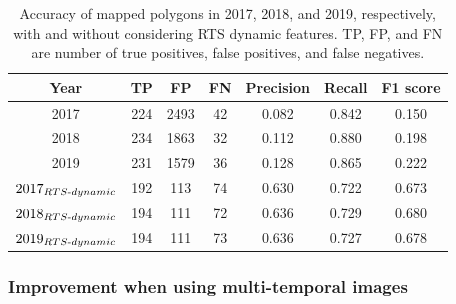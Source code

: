 \documentclass[authoryear,preprint,review,12pt]{elsarticle}
\begin{document}
\begin{table}[ht]
\footnotesize
  \centering
  \caption{Accuracy of mapped polygons in 2017, 2018, and 2019, respectively, with and without considering RTS dynamic features. TP, FP, and FN are number of true positives, false positives, and false negatives.}
    \begin{tabular}{c c c c c c c}
\toprule
    \textbf{Year} & \textbf{TP} & \textbf{FP} & \textbf{FN} & \textbf{Precision} & \textbf{Recall} & \textbf{F1 score} \\
\midrule
   2017 & 224   & 2493  & 42    & 0.082 & 0.842 & 0.150 \\
   2018 & 234   & 1863  & 32    & 0.112 & 0.880 & 0.198 \\
   2019 & 231   & 1579  & 36    & 0.128 & 0.865 & 0.222 \\
   $2017_{RTS{\text -}dynamic}$ & 192   & 113   & 74    & 0.630 & 0.722 & 0.673 \\
   $2018_{RTS{\text -}dynamic}$ & 194   & 111   & 72    & 0.636 & 0.729 & 0.680 \\
   $2019_{RTS{\text -}dynamic}$ & 194   & 111   & 73    & 0.636 & 0.727 & 0.678 \\

\bottomrule
    \end{tabular}
  \label{table_accuracy_f1}
\end{table}


\subsubsection{Improvement when using multi-temporal images}
\label{sec_improve_using_multi_images}
\end{document}
